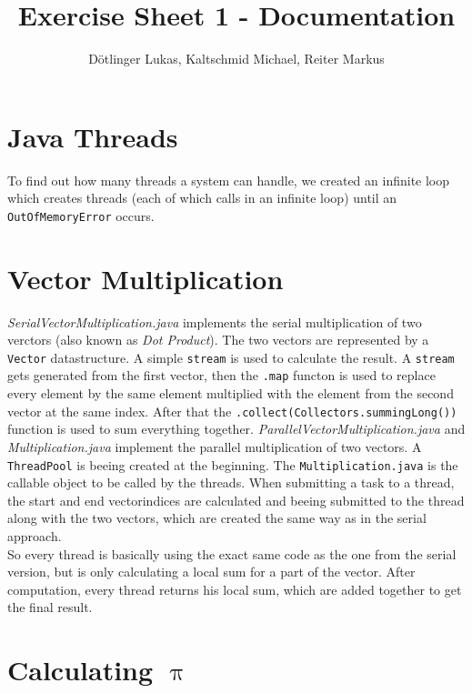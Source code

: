 \documentclass{article}
\begin{document}
	\title{Exercise Sheet 1 - Documentation}
	\date{}
	\author{Dötlinger Lukas, Kaltschmid Michael, Reiter Markus}

	\maketitle


	\section{Java Threads}


    To find out how many threads a system can handle, we created an infinite loop which creates threads (each of which calls  in an infinite loop) until an \texttt{OutOfMemoryError} occurs.

	\section{Vector Multiplication}
		\textit{SerialVectorMultiplication.java} implements the serial multiplication of two verctors (also known as \textit{Dot Product}). The two vectors are represented by a \texttt{Vector} datastructure. A simple \texttt{stream} is used to calculate the result. A \texttt{stream} gets generated from the first vector, then the \texttt{.map} functon is used to replace every element by the same element multiplied with the element from the second vector at the same index. After that the \texttt{.collect(Collectors.summingLong())} function is used to sum everything together.\bigbreak
		\textit{ParallelVectorMultiplication.java} and \textit{Multiplication.java} implement the parallel multiplication of two vectors. A \texttt{ThreadPool} is beeing created at the beginning. The \texttt{Multiplication.java} is the callable object to be called by the threads. When submitting a task to a thread, the start and end vectorindices are calculated and beeing submitted to the thread along with the two vectors, which are created the same way as in the serial approach.\\ 
		So every thread is basically using the exact same code as the one from the serial version, but is only calculating a local sum for a part of the vector.
		After computation, every thread returns his local sum, which are added together to get the final result.


  \section{Calculating $\uppi$}
\end{document}
